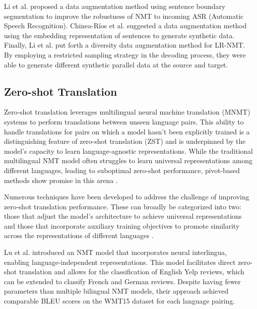\documentclass[acmsmall]{acmart}
\begin{document}
Li et al. \cite{n4-sixteen16} proposed a data augmentation method using sentence boundary segmentation to improve the robustness of NMT to incoming ASR (Automatic Speech Recognition). Chinea-Ríos et al. \cite{n4-seventeen17} suggested a data augmentation method using the embedding representation of sentences to generate synthetic data. Finally, Li et al. \cite{n4-eighteen18} put forth a diversity data augmentation method for LR-NMT. By employing a restricted sampling strategy in the decoding process, they were able to generate different synthetic parallel data at the source and target.

\subsection{Zero-shot Translation}


Zero-shot translation leverages multilingual neural machine translation (MNMT) systems to perform translations between unseen language pairs. This ability to handle translations for pairs on which a model hasn't been explicitly trained is a distinguishing feature of zero-shot translation (ZST) and is underpinned by the model's capacity to learn language-agnostic representations. While the traditional multilingual NMT model often struggles to learn universal representations among different languages, leading to suboptimal zero-shot performance, pivot-based methods show promise in this arena \cite{10.1162/tacl_a_00065,ijcai2017p555}.

Numerous techniques have been developed to address the challenge of improving zero-shot translation performance. These can broadly be categorized into two: those that adjust the model's architecture to achieve universal representations \cite{lu-etal-2018-neural, JiZDZCL20, liu-etal-2021-improving-zero, chen-etal-2021-zero} and those that incorporate auxiliary training objectives to promote similarity across the representations of different languages \cite{abs-1903-07091, al-shedivat-parikh-2019-consistency, pham-etal-2019-improving, pan-etal-2021-contrastive}. 

Lu et al. \cite{lu-etal-2018-neural} introduced an NMT model that incorporates neural interlingua, enabling language-independent representations. This model facilitates direct zero-shot translation and allows for the classification of English Yelp reviews, which can be extended to classify French and German reviews. Despite having fewer parameters than multiple bilingual NMT models, their approach achieved comparable BLEU scores on the WMT15 dataset for each language pairing.
\end{document}
